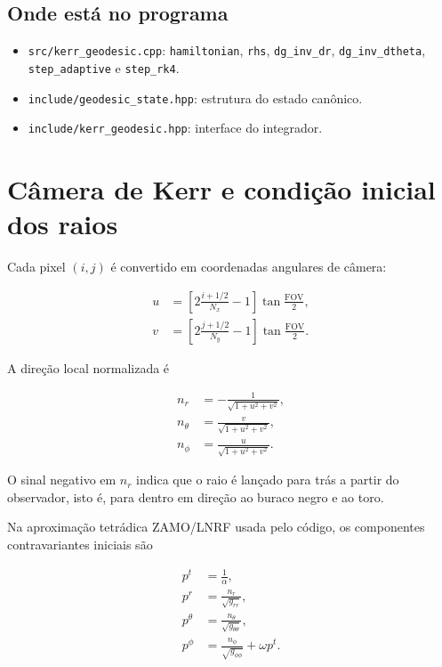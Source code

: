 \documentclass[11pt,a4paper]{article}
\begin{document}
\subsection*{Onde está no programa}

\begin{itemize}
  \item \texttt{src/kerr\_geodesic.cpp}: \texttt{hamiltonian},
  \texttt{rhs}, \texttt{dg\_inv\_dr}, \texttt{dg\_inv\_dtheta},
  \texttt{step\_adaptive} e \texttt{step\_rk4}.
  \item \texttt{include/geodesic\_state.hpp}: estrutura do estado canônico.
  \item \texttt{include/kerr\_geodesic.hpp}: interface do integrador.
\end{itemize}

\section{Câmera de Kerr e condição inicial dos raios}

Cada pixel $(i,j)$ é convertido em coordenadas angulares de câmera:

\begin{align}
  u &= \left[2\frac{i+1/2}{N_x}-1\right]\tan\frac{\mathrm{FOV}}{2},\\
  v &= \left[2\frac{j+1/2}{N_y}-1\right]\tan\frac{\mathrm{FOV}}{2}.
\end{align}

A direção local normalizada é

\begin{align}
  n_r &= -\frac{1}{\sqrt{1+u^2+v^2}},\\
  n_\theta &= \frac{v}{\sqrt{1+u^2+v^2}},\\
  n_\phi &= \frac{u}{\sqrt{1+u^2+v^2}}.
\end{align}

O sinal negativo em $n_r$ indica que o raio é lançado para trás a partir do
observador, isto é, para dentro em direção ao buraco negro e ao toro.

Na aproximação tetrádica ZAMO/LNRF usada pelo código, os componentes
contravariantes iniciais são

\begin{align}
  p^t &= \frac{1}{\alpha},\\
  p^r &= \frac{n_r}{\sqrt{g_{rr}}},\\
  p^\theta &= \frac{n_\theta}{\sqrt{g_{\theta\theta}}},\\
  p^\phi &= \frac{n_\phi}{\sqrt{g_{\phi\phi}}}+\omega p^t.
\end{align}
\end{document}
